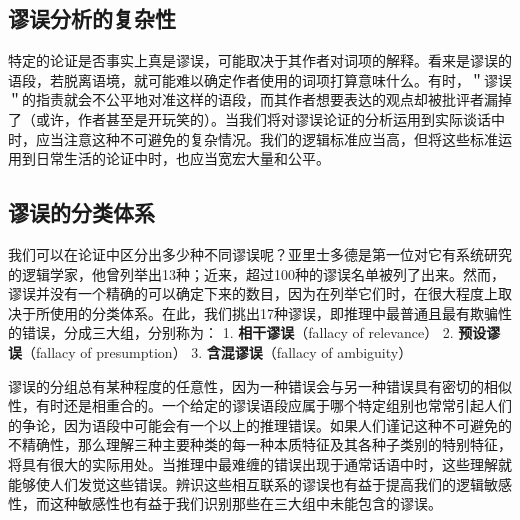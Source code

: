 \subsection{谬误分析的复杂性}

特定的论证是否事实上真是谬误，可能取决于其作者对词项的解释。看来是谬误的语段，若脱离语境，就可能难以确定作者使用的词项打算意味什么。有时，＂谬误＂的指责就会不公平地对准这样的语段，而其作者想要表达的观点却被批评者漏掉了（或许，作者甚至是开玩笑的）。当我们将对谬误论证的分析运用到实际谈话中时，应当注意这种不可避免的复杂情况。我们的逻辑标准应当高，但将这些标准运用到日常生活的论证中时，也应当宽宏大量和公平。

\subsection{谬误的分类体系}

我们可以在论证中区分出多少种不同谬误呢？亚里士多德是第一位对它有系统研究的逻辑学家，他曾列举出13种\cite{aristotle}；近来，超过100种的谬误名单被列了出来。\cite{fearnside1959}然而，谬误并没有一个精确的可以确定下来的数目，因为在列举它们时，在很大程度上取决于所使用的分类体系。在此，我们挑出17种谬误，即推理中最普通且最有欺骗性的错误，分成三大组，分别称为：
1. \textbf{相干谬误}（fallacy of relevance）
2. \textbf{预设谬误}（fallacy of presumption）
3. \textbf{含混谬误}（fallacy of ambiguity）\cite{joseph1916}

谬误的分组总有某种程度的任意性，因为一种错误会与另一种错误具有密切的相似性，有时还是相重合的。一个给定的谬误语段应属于哪个特定组别也常常引起人们的争论，因为语段中可能会有一个以上的推理错误。如果人们谨记这种不可避免的不精确性，那么理解三种主要种类的每一种本质特征及其各种子类别的特别特征，将具有很大的实际用处。当推理中最难缠的错误出现于通常话语中时，这些理解就能够使人们发觉这些错误。辨识这些相互联系的谬误也有益于提高我们的逻辑敏感性，而这种敏感性也有益于我们识别那些在三大组中未能包含的谬误。

\begin{center}
\end{center} 